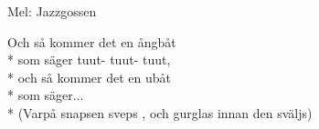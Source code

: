 \begin{SongText}[Ångbåten]
    \begin{SongInfo}
        Mel: Jazzgossen
    \end{SongInfo}
    \begin{SongVerse}
        Och så kommer det en ångbåt\\*%
        som säger tuut- tuut- tuut,\\*%
        och så kommer det en ubåt\\*%
        som säger...\\*%
        (Varpå snapsen sveps , och gurglas innan den sväljs)
    \end{SongVerse}
\end{SongText}
